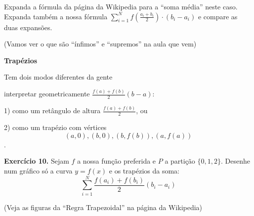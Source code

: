 \documentclass[oneside,12pt]{article}
\begin{document}
Expanda a fórmula da página da Wikipedia para a ``soma média'' neste
caso. Expanda também a nossa fórmula $\sum_{i=1}^N
f(\frac{a_i+b_i}{2})·(b_i-a_i)$ e compare as duas expansões.

\msk

(Vamos ver o que são ``ínfimos'' e ``supremos'' na aula que vem)

\newpage

{\bf Trapézios}

Tem dois modos diferentes da gente

interpretar geometricamente $\frac{f(a)+f(b)}{2} (b-a)$:

\msk

1) como um retângulo de altura $\frac{f(a)+f(b)}{2}$, ou

2) como um trapézio com vértices
%
$$(a,0), (b,0), (b,f(b)), (a,f(a))$$.

{\bf Exercício 10.} Sejam $f$ a nossa função preferida e $P$ a
partição $\{0,1,2\}$. Desenhe num gráfico só a curva $y=f(x)$ e os
trapézios da soma:
%
$$\sum_{i=1}^N \frac{f(a_i)+f(b_i)}{2} (b_i-a_i)$$

(Veja as figuras da ``Regra Trapezoidal'' na página da Wikipedia)
\end{document}
